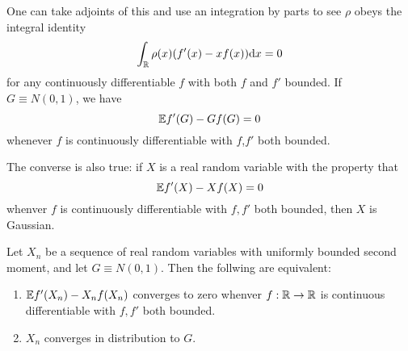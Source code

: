 One can take adjoints of this and use an integration by parts to see $\rho$ obeys the integral identity
\begin{equation*}
    \int_{\mathbb{R}}\rho (x)(f'(x)-xf(x))\mathrm{d} x=0
\end{equation*}
for any continuously differentiable $f$ with both $f$ and $f'$ bounded.
If $G\equiv N(0,1)$, we have 
\begin{equation}\label{Stein identity}
    \mathbb{E} f'(G)-Gf(G)=0
\end{equation}
whenever $f$ is continuously differentiable with $f$,$f'$ both bounded. 

The converse is also true: if $X$ is a real random variable with the property that 
\begin{equation*}
    \mathbb{E} f'(X)-Xf(X)=0
\end{equation*}
whenver $f$ is continuously differentiable with $f,f'$ both bounded, then $X$ is Gaussian. 

\begin{theorem}
    Let $X_n$ be a sequence of real random variables with uniformly bounded second moment, and let $G\equiv N(0,1)$. Then the follwing are equivalent:
    \begin{enumerate}
        \item $\mathbb{E} f'(X_n)-X_nf(X_n)$ converges to zero whenver $f:\mathbb{R} \to \mathbb{R} $ is continuous differentiable with $f,f'$ both bounded.
        \item $X_n$ converges in distribution to $G$.
    \end{enumerate}
\end{theorem}

